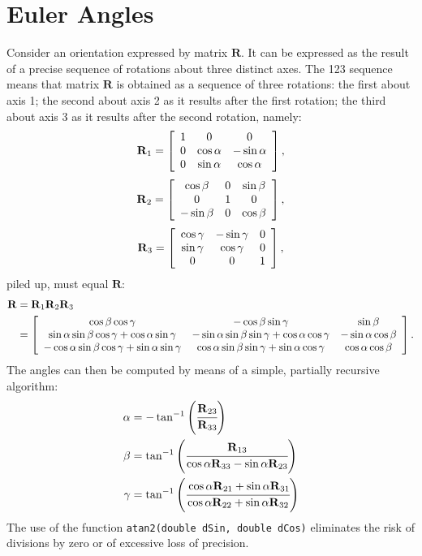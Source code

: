 \documentclass[10pt,dvips,fleqn,subeqn]{report}
\newcommand{\T}[1]{\bm{\mathbf{#1}}}
\begin{document}
\section{Euler Angles}
Consider an orientation expressed by matrix $\T{R}$.
It can be expressed as the result of a precise sequence of rotations 
about three distinct axes.
The 123 sequence means that matrix $\T{R}$ is obtained as a sequence
of three rotations: the first about axis 1; the second about axis 2
as it results after the first rotation; the third about axis 3
as it results after the second rotation, namely:
\begin{equation}
	\T{R}_1 = \sqbr{\matr{ccc}{
		1 & 0 & 0 \\
		0 & \cos\alpha & -\sin\alpha \\
		0 & \sin\alpha & \cos\alpha
	}} ,
\end{equation}
\begin{equation}
	\T{R}_2 = \sqbr{\matr{ccc}{
		\cos\beta & 0 & \sin\beta \\
		0 & 1 & 0 \\
		-\sin\beta & 0 & \cos\beta
	}} ,
\end{equation}
\begin{equation}
	\T{R}_3 = \sqbr{\matr{ccc}{
		\cos\gamma & -\sin\gamma & 0 \\
		\sin\gamma & \cos\gamma & 0 \\
		0 & 0 & 1
	}} ,
\end{equation}
piled up, must equal $\T{R}$:
\begin{align}
	\T{R} &= \T{R}_1 \T{R}_2 \T{R}_3 \\
	&= \sqbr{\matr{ccc}{
		\cos\beta \cos\gamma
		& -\cos\beta \sin\gamma
		& \sin\beta \\
		\sin\alpha \sin\beta \cos\gamma + \cos\alpha \sin\gamma
		& -\sin\alpha \sin\beta \sin\gamma + \cos\alpha \cos\gamma
		& -\sin\alpha \cos\beta \\
		-\cos\alpha \sin\beta \cos\gamma + \sin\alpha \sin\gamma
		& \cos\alpha \sin\beta \sin\gamma + \sin\alpha \cos\gamma
		& \cos\alpha \cos\beta
	}} \nonumber .
\end{align}
The angles can then be computed by means of a simple, 
partially recursive algorithm:
\begin{align}
	\alpha &= - \tan^{-1}\plbr{\cfrac{\T{R}_{23}}{\T{R}_{33}}} \\
	\beta &= \tan^{-1}\plbr{\cfrac{\T{R}_{13}}{
			\cos\alpha \T{R}_{33} - \sin\alpha \T{R}_{23}
		}} \\
	\gamma &= \tan^{-1}\plbr{\cfrac{
		\cos\alpha \T{R}_{21} + \sin\alpha \T{R}_{31}
	}{
		\cos\alpha \T{R}_{22} + \sin\alpha \T{R}_{32}
	}}
\end{align}
The use of the function \texttt{atan2(double dSin, double dCos)}
eliminates the risk of divisions by zero or of excessive loss of precision.
\end{document}
